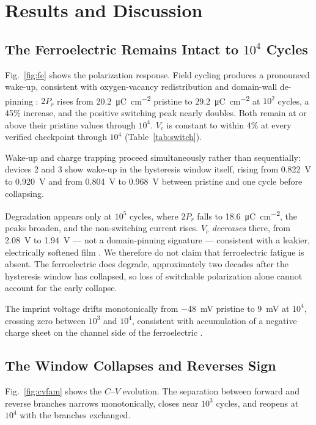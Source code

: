 \documentclass[journal]{IEEEtran}
\newcommand{\rev}[1]{#1}                    %
\newcommand{\Prem}{P_r}
\newcommand{\Vc}{V_c}
\newcommand{\ucm}{\micro\coulomb\per\centi\meter\squared}
\begin{document}
\section{Results and Discussion}

\subsection{The Ferroelectric Remains Intact to $10^4$ Cycles}
Fig.~\ref{fig:fe} shows the polarization response. Field cycling
produces a pronounced wake-up, consistent with oxygen-vacancy
redistribution and domain-wall de-pinning
\cite{cho2024,Trapping_dynamic2}: $2\Prem$ rises from \SI{20.2}{\ucm}
pristine to \SI{29.2}{\ucm} at $10^2$ cycles, a 45\% increase, and the
positive switching peak nearly doubles. Both remain at or above their
pristine values through $10^4$. $\Vc$ is constant to within 4\% at every
verified checkpoint through $10^4$ (Table~\ref{tab:switch}).

\rev{Wake-up and charge trapping proceed simultaneously rather than
sequentially: devices 2 and 3 show wake-up in the hysteresis window
itself, rising from \SI{0.822}{\volt} to \SI{0.920}{\volt} and from
\SI{0.804}{\volt} to \SI{0.968}{\volt} between pristine and one cycle
before collapsing.}

Degradation appears only at $10^5$ cycles, where $2\Prem$ falls to
\SI{18.6}{\ucm}, the peaks broaden, and the non-switching current rises.
$\Vc$ \emph{decreases} there, from \SI{2.08}{\volt} to
\SI{1.94}{\volt} --- not a domain-pinning signature --- consistent with a
leakier, electrically softened film \cite{Poole_Frankel_2}.
\rev{We therefore do not claim that ferroelectric fatigue is absent. The
ferroelectric does degrade, approximately two decades after the
hysteresis window has collapsed, so loss of switchable polarization
alone cannot account for the early collapse.}

The imprint voltage drifts monotonically from \SI{-48}{\milli\volt}
pristine to \SI{+9}{\milli\volt} at $10^4$, crossing zero between $10^3$
and $10^4$, consistent with accumulation of a negative charge sheet on
the channel side of the ferroelectric \cite{imprint3}.

\subsection{The Window Collapses and Reverses Sign}
Fig.~\ref{fig:cvfam} shows the $C$--$V$ evolution. The separation
between forward and reverse branches narrows monotonically, closes near
$10^3$ cycles, and reopens at $10^4$ with the branches exchanged.
\end{document}

